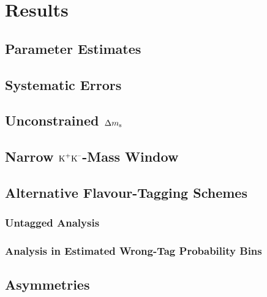 \chapter{Results}
\label{chap:result}

\section{Parameter Estimates}
\section{Systematic Errors}
\section{Unconstrained \texorpdfstring{$\Delta m_\text{s}$}{Deltams}}
\section{Narrow \texorpdfstring{$\text{K}^\text{+}\text{K}^\text{--}$}{KK}-Mass Window}
\section{Alternative Flavour-Tagging Schemes}
\subsection{Untagged Analysis}
\subsection{Analysis in Estimated Wrong-Tag Probability Bins}
\section{\texorpdfstring{\BsBsbar{}}{Bs0-Bs0bar} Asymmetries}
